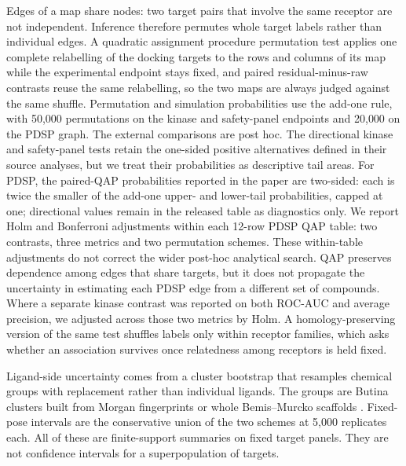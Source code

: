 Edges of a map share nodes: two target pairs that involve the same receptor are not independent.
Inference therefore permutes whole target labels rather than individual edges. A quadratic
assignment procedure permutation test \cite{hubert1976} applies one complete relabelling of the
docking targets to the rows and columns of its map while the experimental endpoint stays fixed,
and paired residual-minus-raw contrasts reuse the same relabelling, so the two maps are always
judged against the same shuffle. Permutation and simulation probabilities use the add-one rule,
with 50{,}000 permutations on the kinase and safety-panel endpoints and 20{,}000 on the PDSP
graph. The external comparisons are post hoc. The directional kinase and safety-panel tests retain
the one-sided positive alternatives defined in their source analyses, but we treat their
probabilities as descriptive tail areas. For PDSP, the paired-QAP
probabilities reported in the paper are two-sided: each is twice the smaller of the add-one
upper- and lower-tail probabilities, capped at one;
directional values remain in the released table as diagnostics only. We report Holm and Bonferroni
adjustments within each 12-row PDSP QAP table: two contrasts, three metrics and two permutation
schemes. These within-table adjustments do not correct the wider post-hoc analytical search. QAP preserves
dependence among edges that share targets, but it does not propagate the uncertainty in estimating
each PDSP edge from a different set of compounds. Where a separate kinase contrast
was reported on both ROC-AUC and average precision, we adjusted across those two metrics by Holm. A
homology-preserving version of the same test shuffles labels only within receptor families, which asks
whether an association survives once relatedness among receptors is held fixed.

Ligand-side uncertainty comes from a cluster bootstrap that resamples chemical groups with
replacement rather than individual ligands. The groups are Butina clusters built from Morgan
fingerprints or whole Bemis--Murcko scaffolds
\cite{morgan1965,rogers2010,murcko1996}. Fixed-pose intervals are the conservative
union of the two schemes at 5{,}000 replicates each. All of these are finite-support summaries on
fixed target panels. They are not confidence intervals for a superpopulation of targets.
